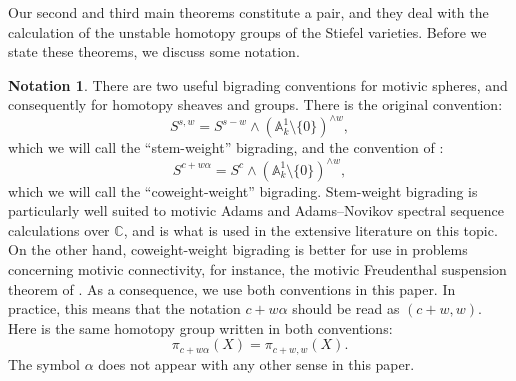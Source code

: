 \documentclass[11pt, oneside, dvipsnames, svgnames, table, final]{amsart}
\newcommand{\mathbx}[1]{\mathbb{#1}}
\theoremstyle{plain}
\theoremstyle{definition}
\newtheorem{notation}[thm]{Notation}
\theoremstyle{remark}
\newcommand{\C}{\mathbx{C}}
\newcommand{\A}{\mathbx{A}}
\newcommand{\sm}{\setminus}
\newcommand{\<}[1]{{\langle}#1 {\rangle}}
\begin{document}
Our second and third main theorems constitute a pair, and they deal with the calculation of the unstable homotopy groups of the Stiefel varieties. Before we state these theorems, we discuss some notation.
\begin{notation}
There are two useful bigrading conventions for motivic spheres, and consequently for homotopy sheaves and groups. There is the original convention:
\[ S^{s,w} = S^{s-w} \wedge (\A^1_k \sm \{0\})^{\wedge w}, \]
which we will call the ``stem-weight'' bigrading,
and the convention of \cite{Hu2011b}:
\[ S^{c+w\alpha} = S^c \wedge  (\A^1_k \sm \{0\})^{\wedge w}, \]
which we will call the ``coweight-weight'' bigrading.
Stem-weight bigrading is particularly well suited to motivic Adams and Adams--Novikov spectral sequence calculations over $\C$, and is what is used in the extensive literature on this topic. On the other hand, coweight-weight bigrading is better for use in problems concerning motivic connectivity, for instance, the motivic Freudenthal suspension theorem of \cite{Asok2024}. As a consequence, we use both conventions in this paper. In practice, this means that the notation $c+w\alpha$ should be read as $(c+w,w)$. Here is the same homotopy group written in both conventions:
\[ \pi_{c+w\alpha}(X) = \pi_{c+w,w}(X). \]
The symbol $\alpha$ does not appear with any other sense in this paper.
\end{notation}
\end{document}

